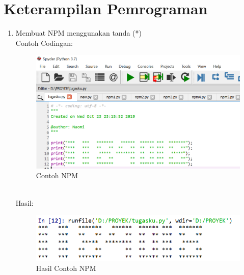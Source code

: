\section{Keterampilan Pemrograman}
\begin{enumerate}
    \item Membuat NPM menggunakan tanda (*)\\
    Contoh Codingan:
    \begin{figure}[!htbp]
    \centering
    \includegraphics[width=15cm]{gambar2/npm.png}
    \caption{Contoh NPM}
    \end{figure}\\
    Hasil:
    \begin{figure}[!htbp]
    \centering
    \includegraphics[width=15cm]{gambar2/npm1.png}
    \caption{Hasil Contoh NPM}
    \end{figure}
    

\end{enumerate}
